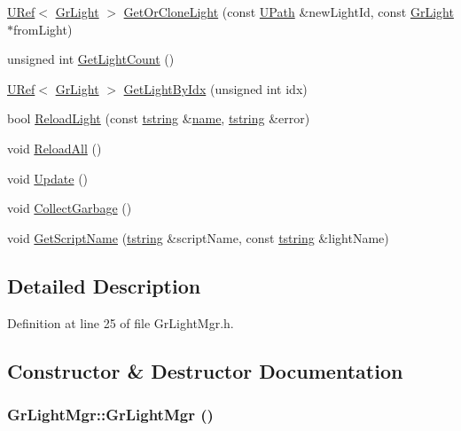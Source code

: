 \begin{CompactItemize}
\item 
\hyperlink{class_u_ref}{URef}$<$ \hyperlink{class_gr_light}{GrLight} $>$ \hyperlink{class_gr_light_mgr_24933a06e2f523461e064a3931c9f49f}{GetOrCloneLight} (const \hyperlink{class_u_path}{UPath} \&newLightId, const \hyperlink{class_gr_light}{GrLight} $\ast$fromLight)
\item 
unsigned int \hyperlink{class_gr_light_mgr_550cba35490e5bc82c59cbd314867b34}{GetLightCount} ()
\item 
\hyperlink{class_u_ref}{URef}$<$ \hyperlink{class_gr_light}{GrLight} $>$ \hyperlink{class_gr_light_mgr_202866b0eedfe24b2b89a74559d32e9d}{GetLightByIdx} (unsigned int idx)
\item 
bool \hyperlink{class_gr_light_mgr_b3e17843ed610744b41e0687fd69e39e}{ReloadLight} (const \hyperlink{common__afx_8h_816fa58fd77499b0edb2c69ebe803d5c}{tstring} \&\hyperlink{glext__bak_8h_bb62efe59ccdd153ce42e1a418352209}{name}, \hyperlink{common__afx_8h_816fa58fd77499b0edb2c69ebe803d5c}{tstring} \&error)
\item 
void \hyperlink{class_gr_light_mgr_13f7ffc5a5cd10224fc254559d67e9c9}{ReloadAll} ()
\item 
void \hyperlink{class_gr_light_mgr_8e7e04849ad7d91f6e5a330b6d9fe996}{Update} ()
\item 
void \hyperlink{class_gr_light_mgr_c2b28fc11940063d19cd95284d373ed3}{CollectGarbage} ()
\item 
void \hyperlink{class_gr_light_mgr_0562b96df126321d6d85efffcda2d054}{GetScriptName} (\hyperlink{common__afx_8h_816fa58fd77499b0edb2c69ebe803d5c}{tstring} \&scriptName, const \hyperlink{common__afx_8h_816fa58fd77499b0edb2c69ebe803d5c}{tstring} \&lightName)
\end{CompactItemize}


\subsection{Detailed Description}


Definition at line 25 of file GrLightMgr.h.

\subsection{Constructor \& Destructor Documentation}
\hypertarget{class_gr_light_mgr_ea373f5ff2835f15c63767346023affa}{
\subsubsection[{GrLightMgr}]{\setlength{\rightskip}{0pt plus 5cm}GrLightMgr::GrLightMgr ()}}
\label{class_gr_light_mgr_ea373f5ff2835f15c63767346023affa}




